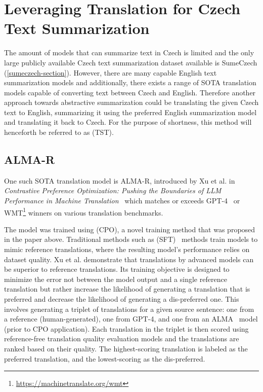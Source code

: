 \documentclass[english, ba, kiv, he, iso690numb, pdf, viewonly]{fasthesis}
\begin{document}
\section{Leveraging Translation for Czech Text Summarization}\label{methods:translate}
The amount of models that can summarize text in Czech is limited and the only large publicly available Czech text summarization dataset available is SumeCzech (\ref{sumeczech-section}). However, there are many capable English text summarization models and additionally, there exists a range of SOTA translation models capable of converting text between Czech and English. Therefore another approach towards abstractive summarization could be translating the given Czech text to English, summarizing it using the preferred English summarization model and translating it back to Czech. For the purpose of shortness, this method will henceforth be referred to as  (TST).
\subsection{ALMA-R}
One such SOTA translation model is ALMA-R, introduced by Xu et al. in \textit{Contrastive Preference Optimization: Pushing the Boundaries of LLM Performance in Machine Translation}~\cite{xu2024contrastive} which matches or exceeds GPT-4~\cite{openai2024gpt4} or WMT\footnote{\url{https://machinetranslate.org/wmt}} winners on various translation benchmarks. 

The model was trained using  (CPO), a novel training method that was proposed in the paper above. Traditional methods such as  (SFT)~\cite{goodfellow2016deep} methods train models to mimic reference translations, where the resulting model's performance relies on dataset quality. Xu et al. demonstrate that translations by advanced models can be superior to reference translations. Its training objective is designed to minimize the error not between the model output and a single reference translation but rather increase the likelihood of generating a translation that is preferred and decrease the likelihood of generating a dis-preferred one. This involves generating a triplet of translations for a given source sentence: one from a reference (human-generated), one from GPT-4, and one from an ALMA~\cite{xu2024paradigm} model (prior to CPO application). Each translation in the triplet is then scored using reference-free translation quality evaluation models and the translations are ranked based on their quality. The highest-scoring translation is labeled as the preferred translation, and the lowest-scoring as the dis-preferred. 
\end{document}
